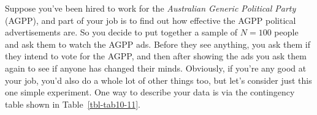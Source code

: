 \documentclass[
  a4paper,
]{book}
\begin{document}
Suppose you've been hired to work for the \emph{Australian Generic
Political Party} (AGPP), and part of your job is to find out how
effective the AGPP political advertisements are. So you decide to put
together a sample of \(N = 100\) people and ask them to watch the AGPP
ads. Before they see anything, you ask them if they intend to vote for
the AGPP, and then after showing the ads you ask them again to see if
anyone has changed their minds. Obviously, if you're any good at your
job, you'd also do a whole lot of other things too, but let's consider
just this one simple experiment. One way to describe your data is via
the contingency table shown in Table~\ref{tbl-tab10-11}.

\hypertarget{tbl-tab10-11}{}
 
  \providecommand{\huxb}[2]{\arrayrulecolor[RGB]{#1}\global\arrayrulewidth=#2pt}
  \providecommand{\huxvb}[2]{\color[RGB]{#1}\vrule width #2pt}
  \providecommand{\huxtpad}[1]{\rule{0pt}{#1}}
  \providecommand{\huxbpad}[1]{\rule[-#1]{0pt}{#1}}
\end{document}
